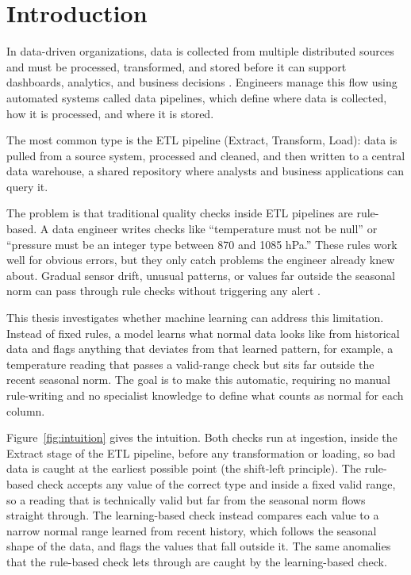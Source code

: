 \documentclass[12pt]{article}
\begin{document}
\section{Introduction}\label{sec:introduction}

In data-driven organizations, data is collected from multiple distributed sources and must be processed, transformed, and stored before it can support dashboards, analytics, and business decisions \cite{munappy2020datapipeline}. Engineers manage this flow using automated systems called data pipelines, which define where data is collected, how it is processed, and where it is stored.

The most common type is the ETL pipeline (Extract, Transform, Load): data is pulled from a source system, processed and cleaned, and then written to a central data warehouse, a shared repository where analysts and business applications can query it.

The problem is that traditional quality checks inside ETL pipelines are rule-based. A data engineer writes checks like ``temperature must not be null'' or ``pressure must be an integer type between 870 and 1085 hPa.'' These rules work well for obvious errors, but they only catch problems the engineer already knew about. Gradual sensor drift, unusual patterns, or values far outside the seasonal norm can pass through rule checks without triggering any alert \cite{chu2016datacleaning, Maddali2021AutomatingDQ}.

This thesis investigates whether machine learning can address this limitation. Instead of fixed rules, a model learns what normal data looks like from historical data and flags anything that deviates from that learned pattern, for example, a temperature reading that passes a valid-range check but sits far outside the recent seasonal norm. The goal is to make this automatic, requiring no manual rule-writing and no specialist knowledge to define what counts as normal for each column.

Figure~\ref{fig:intuition} gives the intuition. Both checks run at ingestion, inside the Extract stage of the ETL pipeline, before any transformation or loading, so bad data is caught at the earliest possible point (the shift-left principle). The rule-based check accepts any value of the correct type and inside a fixed valid range, so a reading that is technically valid but far from the seasonal norm flows straight through. The learning-based check instead compares each value to a narrow normal range learned from recent history, which follows the seasonal shape of the data, and flags the values that fall outside it. The same anomalies that the rule-based check lets through are caught by the learning-based check.
\end{document}

